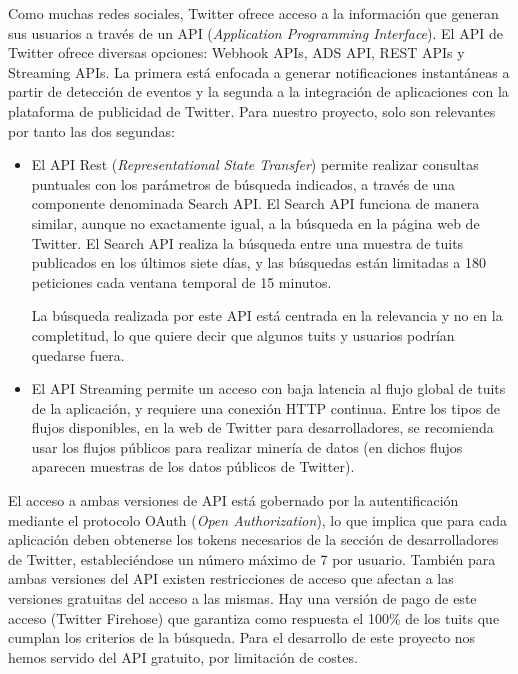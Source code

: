 Como muchas redes sociales, Twitter ofrece acceso a la información que generan sus usuarios a través de un
API ({\em Application Programming Interface})\cite{twitter_dev_web}. El API de Twitter ofrece diversas opciones: 
Webhook APIs, ADS API, REST APIs y Streaming APIs. La primera está enfocada a generar  
notificaciones instantáneas a partir de detección de eventos y la segunda a la integración de aplicaciones con la 
plataforma de publicidad de Twitter. Para nuestro proyecto, solo son relevantes por tanto las dos segundas:
\begin{itemize}
\item El API Rest ({\em Representational State Transfer}) permite realizar consultas puntuales con los parámetros de búsqueda indicados,
a través de una componente denominada Search API. El Search API funciona de manera similar, aunque no 
exactamente igual, a la búsqueda en la página web de Twitter. El Search API 
realiza la búsqueda entre una muestra de tuits publicados en los últimos siete días, y
las búsquedas están limitadas a 180 peticiones cada ventana temporal de 15 minutos. 


La búsqueda realizada por este API está centrada en la relevancia y no en la completitud, lo que 
quiere decir que algunos tuits y usuarios podrían quedarse fuera.

\item El API Streaming permite un acceso con baja latencia al flujo global de tuits de la aplicación,
y requiere una conexión HTTP continua. Entre los tipos de flujos disponibles, en la web de Twitter
para desarrolladores, se recomienda usar los flujos públicos para realizar minería de datos (en dichos flujos
aparecen muestras de los datos públicos de Twitter).


\end{itemize}

El acceso a ambas versiones de API está gobernado por la autentificación mediante el protocolo OAuth
({\em Open Authorization}), lo que implica que para cada aplicación deben obtenerse los tokens necesarios 
de la sección de desarrolladores de Twitter, estableciéndose un número máximo de 7 por usuario.
También para ambas versiones del API existen restricciones de acceso que afectan a las versiones gratuitas del acceso a las
mismas. Hay una versión de pago de este acceso  (Twitter Firehose)
que garantiza como respuesta el 100\% de los tuits que cumplan los criterios de la búsqueda.
Para el desarrollo de este proyecto nos hemos servido del API gratuito, por limitación de costes. 

